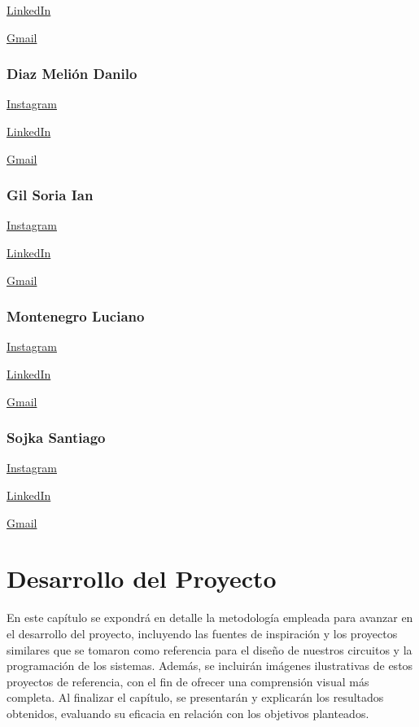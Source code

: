 \documentclass{article}
\begin{document}
    
    \href{https://www.linkedin.com/in/luca-de-blasi-31164b304}{LinkedIn}

    
    \href{mailto:luqac2006@gmail.com}{Gmail}

\subsubsection{Diaz Melión Danilo}

    \href{https://instagram.com/_danilodiaz}{Instagram}

    
    \href{https://www.linkedin.com/in/danilodiazmelion/}{LinkedIn}

    
    \href{mailto:danilodiaz934@gmail.com}{Gmail}

\subsubsection{Gil Soria Ian}

    \href{https://instagram.com/ian_gilsooor}{Instagram}

    
    \href{https://www.linkedin.com/in/ian-lucas-gil-soria-a8090b2a8?utm_source=share&utm_campaign=share_via&utm_content=profile&utm_medium=android_app}{LinkedIn}

    
    \href{mailto:ianlucasgilsoria@gmail.com}{Gmail}

\subsubsection{Montenegro Luciano}


    \href{https://instagram.com/luchito_.montenegro}{Instagram}

    
    \href{https://www.linkedin.com/in/luciano-montenegro-3215aa304}{LinkedIn}

    
    \href{mailto:lucianomontenegro1021@gmail.com}{Gmail}



\subsubsection{Sojka Santiago}

    \href{https://instagram.com/sojkaa.sant}{Instagram}

    
    \href{https://www.linkedin.com/in/santiago-sojka-817198271/}{LinkedIn}

    
    \href{mailto:santiagosojka@gmail.com}{Gmail}




\section{Desarrollo del Proyecto}
En este capítulo se expondrá en detalle la metodología empleada para avanzar en el desarrollo del proyecto, incluyendo las fuentes de inspiración y los proyectos similares que se tomaron como referencia para el diseño de nuestros circuitos y la programación de los sistemas. Además, se incluirán imágenes ilustrativas de estos proyectos de referencia, con el fin de ofrecer una comprensión visual más completa. Al finalizar el capítulo, se presentarán y explicarán los resultados obtenidos, evaluando su eficacia en relación con los objetivos planteados.
\end{document}
